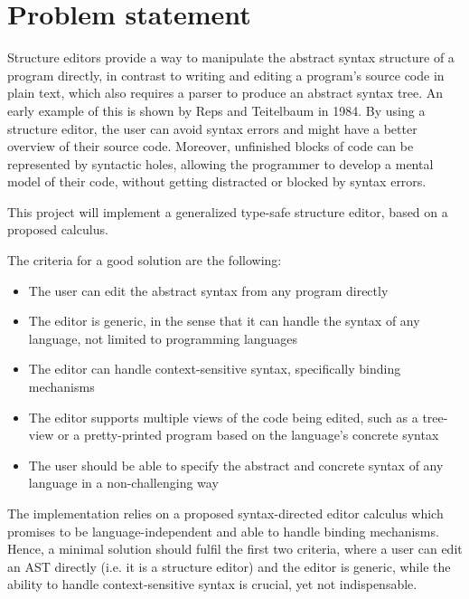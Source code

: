 \section{Problem statement}
Structure editors provide a way to manipulate the abstract syntax structure of a program directly, in contrast to writing and editing a program's source code in plain text, which also requires a parser to produce an abstract syntax tree. An early example of this is shown by Reps and Teitelbaum\cite{timtom84} in 1984.
By using a structure editor, the user can avoid syntax errors and might have a better overview of their source code. Moreover, unfinished blocks of code can be represented by syntactic holes, allowing the programmer to develop a mental model of their code, without getting distracted or blocked by syntax errors.

This project will implement a generalized type-safe structure editor, based on a proposed calculus\cite{aalborg}.

The criteria for a good solution are the following:

\begin{itemize}
    \item The user can edit the abstract syntax from any program directly
    \item The editor is generic, in the sense that it can handle the syntax of any language, not limited to programming languages
    \item The editor can handle context-sensitive syntax, specifically binding mechanisms
    \item The editor supports multiple views of the code being edited, such as a tree-view or a pretty-printed program based on the language's concrete syntax
    \item The user should be able to specify the abstract and concrete syntax of any language in a non-challenging way
\end{itemize}

The implementation relies on a proposed syntax-directed editor calculus\cite{aalborg} which promises to be language-independent and able to handle binding mechanisms. Hence, a minimal solution should fulfil the first two criteria, where a user can edit an AST directly (i.e. it is a structure editor) and the editor is generic, while the ability to handle context-sensitive syntax is crucial, yet not indispensable.

